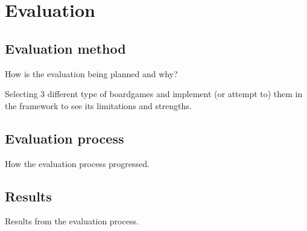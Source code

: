 \chapter{Evaluation} \label{ch:evaluation}
\section{Evaluation method}
How is the evaluation being planned and why?

Selecting 3 different type of boardgames and implement (or attempt to) them in the framework to see its limitations and strengths.

\section{Evaluation process}
How the evaluation process progressed.

\section{Results}
Results from the evaluation process.

\newpage
